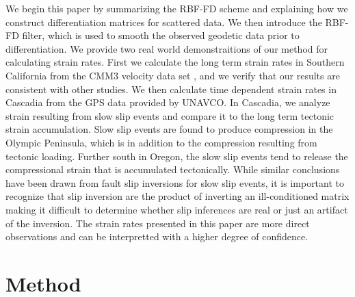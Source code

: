 \documentclass[10pt,a4paper]{article}
\begin{document}
We begin this paper by summarizing the RBF-FD scheme and explaining how we construct differentiation matrices for scattered data. We then introduce the RBF-FD filter, which is used to smooth the observed geodetic data prior to differentiation.  We provide two real world demonstraitions of our method for calculating strain rates.  First we calculate the long term strain rates in Southern California from the CMM3 velocity data set \citep{Shen2011}, and we verify that our results are consistent with other studies. We then calculate time dependent strain rates in Cascadia from the GPS data provided by UNAVCO.  In Cascadia, we analyze strain resulting from slow slip events and compare it to the long term tectonic strain accumulation. Slow slip events are found to produce compression in the Olympic Peninsula, which is in addition to the compression resulting from tectonic loading.  Further south in Oregon, the slow slip events tend to release the compressional strain that is accumulated tectonically.  While similar conclusions have been drawn from fault slip inversions for slow slip events, it is important to recognize that slip inversion are the product of inverting an ill-conditioned matrix making it difficult to determine whether slip inferences are real or just an artifact of the inversion.  The strain rates presented in this paper are more direct observations and can be interpretted with a higher degree of confidence. 

\section{Method}\label{sec:Method}
\end{document}
